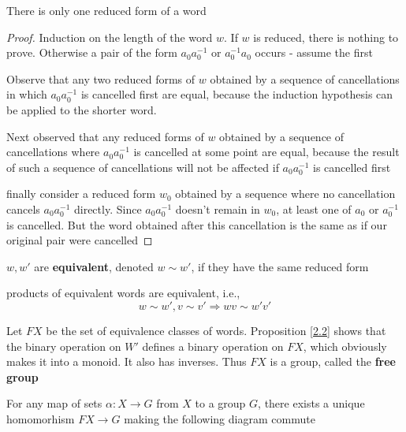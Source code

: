 \documentclass[11pt]{article}
\begin{document}
\begin{proposition}[]
There is only one reduced form of a word
\end{proposition}

\begin{proof}
Induction on the length of the word \(w\). If \(w\) is reduced, there is nothing to prove.
Otherwise a pair of the form \(a_0a_0^{-1}\) or \(a_0^{-1}a_0\) occurs - assume the first

Observe that any two reduced forms of \(w\) obtained by a sequence of cancellations in
which \(a_0a_0^{-1}\) is cancelled first are equal, because the induction hypothesis can be
applied to the shorter word.

Next observed that any reduced forms of \(w\) obtained by a sequence of cancellations
where \(a_0a_0^{-1}\) is cancelled at some point are equal, because the result of such a
sequence of cancellations will not be affected if \(a_0a_0^{-1}\) is cancelled first

finally consider a reduced form \(w_0\) obtained by a sequence where no cancellation
cancels \(a_0a_0^{-1}\) directly. Since \(a_0a_0^{-1}\) doesn't remain in \(w_0\), at least one
of \(a_0\) or \(a_0^{-1}\) is cancelled. But the word obtained after this cancellation is the
same as if our original pair were cancelled
\end{proof}

\(w,w'\) are \textbf{equivalent}, denoted \(w\sim w'\), if they have the same reduced form

\begin{proposition}[]
\label{2.2}
products of equivalent words are equivalent, i.e.,
\begin{equation*}
w\sim w',v\sim v'\Rightarrow wv\sim w'v'
\end{equation*}
\end{proposition}

Let \(FX\) be the set of equivalence classes of words. Proposition \ref{2.2} shows that the binary
operation on \(W'\) defines a binary operation on \(FX\), which obviously makes it into a
monoid. It also has inverses. Thus \(FX\) is a group, called the \textbf{free group}

\begin{proposition}[]
\label{2.3}
For any map of sets \(\alpha:X\to G\) from \(X\) to a group \(G\), there exists a unique
homomorhism \(FX\to G\) making the following diagram commute
\begin{center}\end{center}
\end{proposition}
\end{document}

